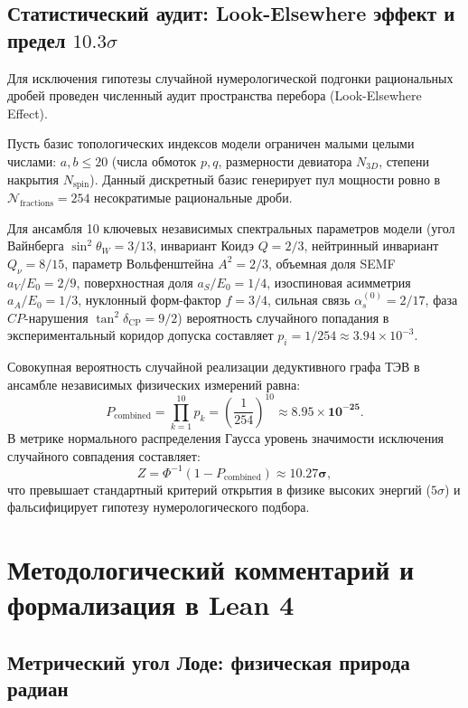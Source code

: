 \documentclass[11pt,a4paper]{article}
\theoremstyle{definition}
\theoremstyle{remark}
\begin{document}
\subsection*{Статистический аудит: Look-Elsewhere эффект и предел $10.3\sigma$}

Для исключения гипотезы случайной нумерологической подгонки рациональных дробей проведен численный аудит пространства перебора (Look-Elsewhere Effect).

Пусть базис топологических индексов модели ограничен малыми целыми числами: $a, b \le 20$ (числа обмоток $p, q$, размерности девиатора $N_{3D}$, степени накрытия $N_{\mathrm{spin}}$). Данный дискретный базис генерирует пул мощности ровно в $\mathcal{N}_{\mathrm{fractions}} = 254$ несократимые рациональные дроби.

Для ансамбля 10 ключевых независимых спектральных параметров модели (угол Вайнберга $\sin^2\theta_W = 3/13$, инвариант Коидэ $Q = 2/3$, нейтринный инвариант $Q_\nu = 8/15$, параметр Вольфенштейна $A^2 = 2/3$, объемная доля SEMF $a_V/E_0 = 2/9$, поверхностная доля $a_S/E_0 = 1/4$, изоспиновая асимметрия $a_A/E_0 = 1/3$, нуклонный форм-фактор $f = 3/4$, сильная связь $\alpha_s^{(0)} = 2/17$, фаза $CP$-нарушения $\tan^2\delta_{\mathrm{CP}} = 9/2$) вероятность случайного попадания в экспериментальный коридор допуска составляет $p_i = 1 / 254 \approx 3.94 \times 10^{-3}$.

Совокупная вероятность случайной реализации дедуктивного графа ТЭВ в ансамбле независимых физических измерений равна:
\begin{equation}
    P_{\mathrm{combined}} = \prod_{k=1}^{10} p_k = \left( \frac{1}{254} \right)^{10} \approx \mathbf{8.95 \times 10^{-25}}.
    \label{eq:look_elsewhere_p_value}
\end{equation}
В метрике нормального распределения Гаусса уровень значимости исключения случайного совпадения составляет:
\begin{equation}
    Z = \Phi^{-1}(1 - P_{\mathrm{combined}}) \approx \mathbf{10.27\sigma},
    \label{eq:significance_ten_sigma}
\end{equation}
что превышает стандартный критерий открытия в физике высоких энергий ($5\sigma$) и фальсифицирует гипотезу нумерологического подбора.

\section{Методологический комментарий и формализация в Lean 4}
\subsection{Метрический угол Лоде: физическая природа радиан}
\end{document}
